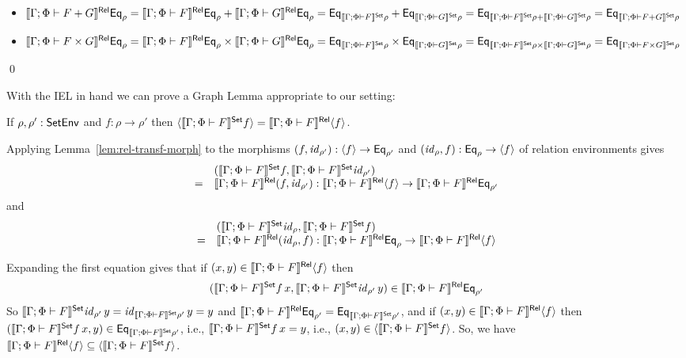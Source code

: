 \documentclass{lmcs}
\theoremstyle{plain}\newtheorem{satz}[thm]{Satz}
\renewcommand{\id}{\mathit{id}}
\begin{document}
{\begin{itemize}
This concludes the fixpoint case.
\item $\llbracket{\Gamma; \Phi \vdash F + G}\rrbracket^{\mathsf{Rel}} \mathsf{Eq}_{\rho} =
  \llbracket{\Gamma; \Phi \vdash F}\rrbracket^{\mathsf{Rel}} \mathsf{Eq}_{\rho} + \llbracket{\Gamma;
    \Phi \vdash G}\rrbracket^{\mathsf{Rel}} \mathsf{Eq}_{\rho} = \mathsf{Eq}_{\llbracket{\Gamma; \Phi \vdash
      F}\rrbracket^{\mathsf{Set}}\rho} + \mathsf{Eq}_{\llbracket{\Gamma; \Phi \vdash G}\rrbracket^{\mathsf{Set}}\rho} =
  \mathsf{Eq}_{\llbracket{\Gamma; \Phi \vdash F}\rrbracket^{\mathsf{Set}}\rho + \llbracket{\Gamma; \Phi
      \vdash G}\rrbracket^{\mathsf{Set}}\rho} = \mathsf{Eq}_{\llbracket{\Gamma; \Phi \vdash F +
      G}\rrbracket^{\mathsf{Set}}\rho}$
\item $\llbracket{\Gamma; \Phi \vdash F \times G}\rrbracket^{\mathsf{Rel}} \mathsf{Eq}_{\rho} =
  \llbracket{\Gamma; \Phi \vdash F}\rrbracket^{\mathsf{Rel}}\mathsf{Eq}_{\rho} \times \llbracket{\Gamma;
    \Phi \vdash G}\rrbracket^{\mathsf{Rel}}\mathsf{Eq}_{\rho} = \mathsf{Eq}_{\llbracket{\Gamma; \Phi \vdash
      F}\rrbracket^{\mathsf{Set}}\rho} \times \mathsf{Eq}_{\llbracket{\Gamma; \Phi \vdash G}\rrbracket^{\mathsf{Set}}\rho}
  = \mathsf{Eq}_{\llbracket{\Gamma; \Phi \vdash F}\rrbracket^{\mathsf{Set}}\rho \times
    \llbracket{\Gamma; \Phi \vdash G}\rrbracket^{\mathsf{Set}}\rho} = \mathsf{Eq}_{\llbracket{\Gamma;
      \Phi \vdash F \times G}\rrbracket^{\mathsf{Set}}\rho}$
\end{itemize}
\qed

With the IEL in hand we can prove a Graph Lemma appropriate to our
setting:
\begin{lem}\label{lem:graph}
If $\rho, \rho' : \mathsf{SetEnv}$ and $f : \rho \to \rho'$ then
$\langle {\llbracket{\Gamma; \Phi \vdash F}\rrbracket^{\mathsf{Set}} f} \rangle = \llbracket{\Gamma; \Phi
  \vdash F}\rrbracket^{\mathsf{Rel}}\langle {f} \rangle$.
\end{lem}
\proof
Applying Lemma~\ref{lem:rel-transf-morph} to the morphisms $(f,
\id_{\rho'}) : \graph{f} \to \Eq_{\rho'}$ and $(\id_{\rho}, f) :
\Eq_{\rho} \to \graph{f}$ of relation environments gives 
\[\begin{array}{ll}
  & (\setsem{\Gamma; \Phi \vdash F}f, \setsem{\Gamma; \Phi \vdash
  F}\id_{\rho'})\\
= & \relsem{\Gamma; \Phi \vdash F} (f, \id_{\rho'}) :
\relsem{\Gamma; \Phi \vdash F}\graph{f} \to \relsem{\Gamma; \Phi
  \vdash F}\Eq_{\rho'}
\end{array}\] and
\[\begin{array}{ll}
  & (\setsem{\Gamma; \Phi \vdash F}\id_{\rho}, \setsem{\Gamma; \Phi
  \vdash F}f)\\
= & \relsem{\Gamma; \Phi \vdash F} (\id_{\rho}, f) : \relsem{\Gamma;
  \Phi \vdash F}\Eq_{\rho} \to \relsem{\Gamma; \Phi \vdash
  F}\graph{f}
\end{array}\] 

Expanding the first equation gives that if $(x,y) \in \llbracket{\Gamma;
  \Phi \vdash F}\rrbracket^{\mathsf{Rel}}\langle {f} \rangle$ then
\[(\setsem{\Gamma; \Phi \vdash F} f\,
x, \setsem{\Gamma; \Phi \vdash F}\id_{\rho'}\, y) \in \relsem{\Gamma;
  \Phi \vdash F}\Eq_{\rho'}\] So $\setsem{\Gamma; \Phi \vdash
  F}\id_{\rho'}\, y = \id_{\setsem{\Gamma; \Phi \vdash F}\rho'}\, y =
y$ and $\llbracket{\Gamma; \Phi \vdash F}\rrbracket^{\mathsf{Rel}}\mathsf{Eq}_{\rho'} =
\mathsf{Eq}_{\llbracket{\Gamma; \Phi \vdash F}\rrbracket^{\mathsf{Set}}\rho'}$, and if $(x,y) \in
\llbracket{\Gamma; \Phi \vdash F}\rrbracket^{\mathsf{Rel}}\langle {f} \rangle$ then $(\llbracket{\Gamma; \Phi
  \vdash F}\rrbracket^{\mathsf{Set}} f\, x, y) \in \mathsf{Eq}_{\llbracket{\Gamma; \Phi \vdash F}\rrbracket^{\mathsf{Set}}\rho'}$,
i.e., $\llbracket{\Gamma; \Phi \vdash F}\rrbracket^{\mathsf{Set}} f\, x = y$, i.e., $(x, y) \in
\langle {\llbracket{\Gamma; \Phi \vdash F}\rrbracket^{\mathsf{Set}} f} \rangle$.  So, we have
$\llbracket{\Gamma; \Phi \vdash F}\rrbracket^{\mathsf{Rel}}\langle {f} \rangle \subseteq
\langle {\llbracket{\Gamma; \Phi \vdash F}\rrbracket^{\mathsf{Set}}f} \rangle$.

}
\end{document}
